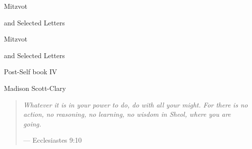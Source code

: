 \documentclass[11pt]{memoir}
\begin{document}
  \frontmatter

  \thispagestyle{empty}
  \null
  \vfill
  \begin{flushright}
    \DisplayFont Mitzvot
    
    \vspace{1ex}

    {\footnotesize and Selected Letters}
  \end{flushright}
  \vfill
  \cleardoublepage

  \pagestyle{plain}

  \doublespacing

  \begin{flushright}
    \null
    \vfill
    {\Huge\DisplayFont Mitzvot}

    \vspace{1ex}

    {\Large\DisplayFont and Selected Letters}

    {\DisplayFont Post-Self book IV}

    \vfill

    {\Large\DisplayFont Madison Scott-Clary}
  \end{flushright}
  \thispagestyle{empty}

  \newpage

  

  \tableofcontents*
  \newpage
  \null
  \cleardoublepage



  \mainmatter

  \pagestyle{ourbook}

  \cleardoublepage
  \null
  \thispagestyle{empty}
  \vfill
  \begin{quote}
    \small
    \emph{Whatever it is in your power to do, do with all your might. For there is no action, no reasoning, no learning, no wisdom in Sheol, where you are going.}

    --- Ecclesiastes 9:10
  \end{quote}
  \vfill
\end{document}

